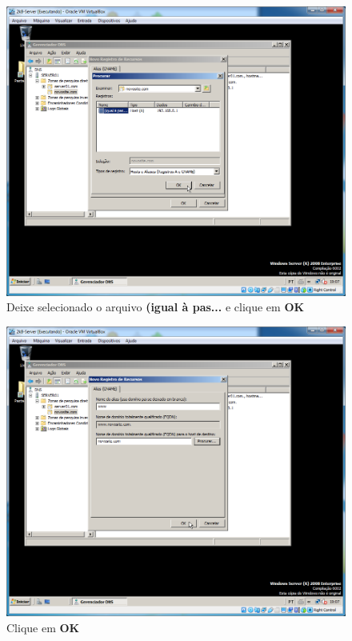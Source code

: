 \documentclass[10pt]{article}
\begin{document}
\begin{figure}[H]
    \centering
    \caption{Deixe selecionado o arquivo \textbf{(igual à pas...} e clique em \textbf{OK}}
    \label{fig:5532019}
    \includegraphics[width=\linewidth]{images/IIS/criando_um_novo_site/019.png}
\end{figure}
\begin{figure}[H]
    \centering
    \caption{Clique em \textbf{OK}}
    \label{fig:5532020}
    \includegraphics[width=\linewidth]{images/IIS/criando_um_novo_site/020.png}
\end{figure}
\end{document}
